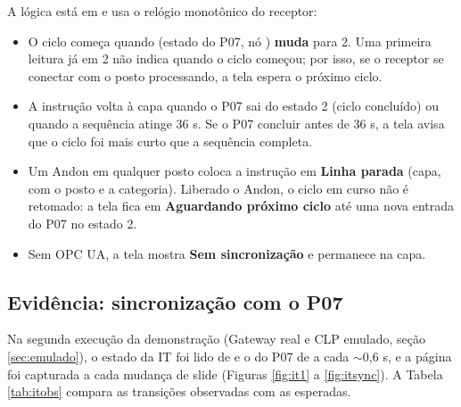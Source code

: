 A lógica está em  e usa o relógio monotônico do receptor:

\begin{itemize}
    \item O ciclo começa quando  (estado do P07, nó ) \textbf{muda} para 2. Uma primeira leitura já em 2 não indica quando o ciclo começou; por isso, se o receptor se conectar com o posto processando, a tela espera o próximo ciclo.
    \item A instrução volta à capa quando o P07 sai do estado 2 (ciclo concluído) ou quando a sequência atinge 36 s. Se o P07 concluir antes de 36 s, a tela avisa que o ciclo foi mais curto que a sequência completa.
    \item Um Andon em qualquer posto coloca a instrução em \textbf{Linha parada} (capa, com o posto e a categoria). Liberado o Andon, o ciclo em curso não é retomado: a tela fica em \textbf{Aguardando próximo ciclo} até uma nova entrada do P07 no estado 2.
    \item Sem OPC UA, a tela mostra \textbf{Sem sincronização} e permanece na capa.
\end{itemize}

\subsection{Evidência: sincronização com o P07}

Na segunda execução da demonstração (Gateway real e CLP emulado, seção \ref{sec:emulado}), o estado da IT foi lido de  e o do P07 de  a cada $\sim$0,6 s, e a página foi capturada a cada mudança de slide (Figuras \ref{fig:it1} a \ref{fig:itsync}). A Tabela \ref{tab:itobs} compara as transições observadas com as esperadas.

